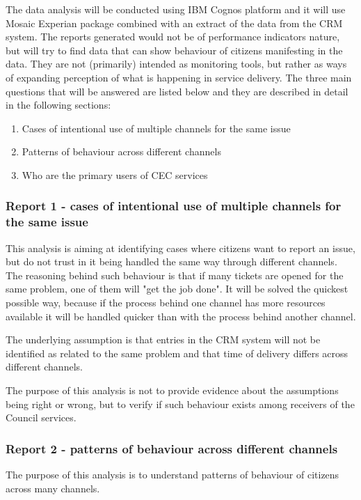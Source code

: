 The data analysis will be conducted using IBM Cognos platform and it will use Mosaic Experian package combined with an extract of the data from the CRM system. The reports generated would not be of performance indicators nature, but will try to find data that can show behaviour of citizens manifesting in the data. They are not (primarily) intended as monitoring tools, but rather as ways of expanding perception of what is happening in service delivery. The three main questions that will be answered are listed below and they are described in detail in the following sections:
\begin{enumerate}
\item Cases of intentional use of multiple channels for the same issue
\item Patterns of behaviour across different channels
\item Who are the primary users of CEC services
\end{enumerate}
		
			\subsubsection{Report 1 - cases of intentional use of multiple channels for the same issue}
			
This analysis is aiming at identifying cases where citizens want to report an issue, but do not trust in it being handled the same way through different channels. The reasoning behind such behaviour is that if many tickets are opened for the same problem, one of them will "get the job done". It will be solved the quickest possible way, because if the process behind one channel has more resources available it will be handled quicker than with the process behind another channel.

The underlying assumption is that entries in the CRM system will not be identified as related to the same problem and that time of delivery differs across different channels.

The purpose of this analysis is not to provide evidence about the assumptions being right or wrong, but to verify if such behaviour exists among receivers of the Council services.
			
			\subsubsection{Report 2 - patterns of behaviour across different channels}
			
The purpose of this analysis is to understand patterns of behaviour of citizens across many channels.


